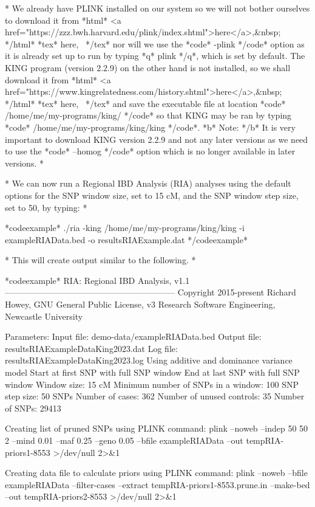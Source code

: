 *
We already have PLINK installed on our system so we will not bother ourselves to download it from *html* <a href="https://zzz.bwh.harvard.edu/plink/index.shtml">here</a>,&nbsp; */html* *tex* here,~ */tex* nor will we use the *code* -plink */code* option as it is already set up to run by typing *q* plink */q*, which is set by default. The KING program (version 2.2.9) on the other hand is not installed, so we shall download it from *html* <a href="https://www.kingrelatedness.com/history.shtml">here</a>,&nbsp; */html* *tex* here,~ */tex* and save the executable file at location *code* /home/me/my-programs/king/ */code* so that KING may be ran by typing *code* /home/me/my-programs/king/king */code*. *b* Note: */b* It is very important to download KING version 2.2.9 and not any later versions as we need to use the *code* --homog */code* option which is no longer available in later versions.
*

*
We can now run a Regional IBD Analysis (RIA) analyses using the default options for the SNP window size, set to 15 cM, and the SNP window step size, set to 50, by typing:
*

*codeexample*
./ria -king /home/me/my-programs/king/king -i exampleRIAData.bed -o resultsRIAExample.dat
*/codeexample*

*
This will create output similar to the following.
*

*codeexample*
RIA: Regional IBD Analysis, v1.1
------------------------------------------------------------
Copyright 2015-present Richard Howey, GNU General Public License, v3
Research Software Engineering, Newcastle University

Parameters:
Input file: demo-data/exampleRIAData.bed
Output file: resultsRIAExampleDataKing2023.dat
Log file: resultsRIAExampleDataKing2023.log
Using additive and dominance variance model
Start at first SNP with full SNP window
End at last SNP with full SNP window
Window size: 15 cM
Minimum number of SNPs in a window: 100
SNP step size: 50 SNPs
Number of cases: 362
Number of unused controls: 35
Number of SNPs: 29413

Creating list of pruned SNPs using PLINK command:
plink --noweb --indep 50 50 2 --mind 0.01 --maf 0.25 --geno 0.05 --bfile exampleRIAData --out tempRIA-priors1-8553 >/dev/null 2>&1

Creating data file to calculate priors using PLINK command:
plink --noweb --bfile exampleRIAData --filter-cases --extract tempRIA-priors1-8553.prune.in --make-bed --out tempRIA-priors2-8553 >/dev/null 2>&1

